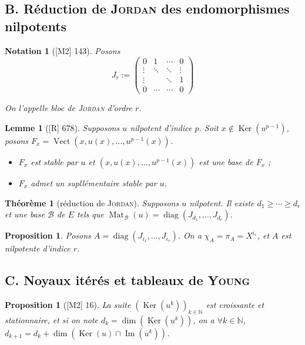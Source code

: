 \documentclass[10pt, a4paper, parskip=full, twoside, twocolumn]{report}
\newtheorem{theorem}[definition]{Théorème}
\newtheorem{proposition}[definition]{Proposition}
\newtheorem{lemma}[definition]{Lemme}
\newtheorem{notation}[definition]{Notation}
\newcommand{\IN}{\mathbb{N}}
\DeclareMathOperator{\im}{Im}
\DeclareMathOperator{\Ker}{Ker}
\DeclareMathOperator{\Mat}{Mat}
\DeclareMathOperator{\diag}{diag}
\DeclareMathOperator{\Vect}{Vect}
\begin{document}
\subsection*{B. Réduction de \textsc{Jordan} des endomorphismes nilpotents}

\begin{notation}[\textnormal{[M2] 143}]
	Posons $$J_r := \begin{pmatrix}
		0 & 1 & \cdots & 0 \\
		\vdots & \ddots & \ddots & \vdots \\
		\vdots & & \ddots & 1 \\
		0 & \cdots & \cdots & 0
	\end{pmatrix}$$

	On l'appelle \emph{bloc de \textsc{Jordan}} d'ordre $r$.
\end{notation}

\begin{lemma}[\textnormal{[R] 678}]
	Supposons $u$ nilpotent d'indice $p$. Soit $x\notin \Ker(u^{p-1})$, posons $F_x = \Vect(x, u(x), \dots, u^{p-1}(x))$.
	\begin{itemize}
		\item $F_x$ est stable par $u$ et $(x,u(x),\dots,u^{p-1}(x))$ est une base de $F_x$ ;
		\item $F_x$ admet un supllémentaire stable par $u$.
	\end{itemize}
\end{lemma}

\begin{theorem}[réduction de \textsc{Jordan}]
	Supposons $u$ nilpotent. Il existe $d_1\geq \cdots\geq d_r$ et une base $\mathcal{B}$ de $E$ tels que $\Mat_{\mathcal{B}}(u) = \diag(J_{d_1},\dots,J_{d_r})$.
\end{theorem}

\begin{proposition}
	Posons $A = \diag(J_{i_1},\dots,J_{i_r})$. On a $\chi_A = \pi_A = X^{i_r}$, et $A$ est nilpotente d'indice $r$.
\end{proposition}

\subsection*{C. Noyaux itérés et tableaux de \textsc{Young}}

\begin{proposition}[\textnormal{[M2] 16}]
	La suite $\left(\Ker(u^k)\right)_{k\in\IN}$ est croissante et stationnaire, et si on note $d_k = \dim(\Ker(u^k))$, on a $\forall k\in \IN$, $d_{k+1} = d_k + \dim(\Ker(u)\cap \im(u^k))$.
\end{proposition}
\end{document}
